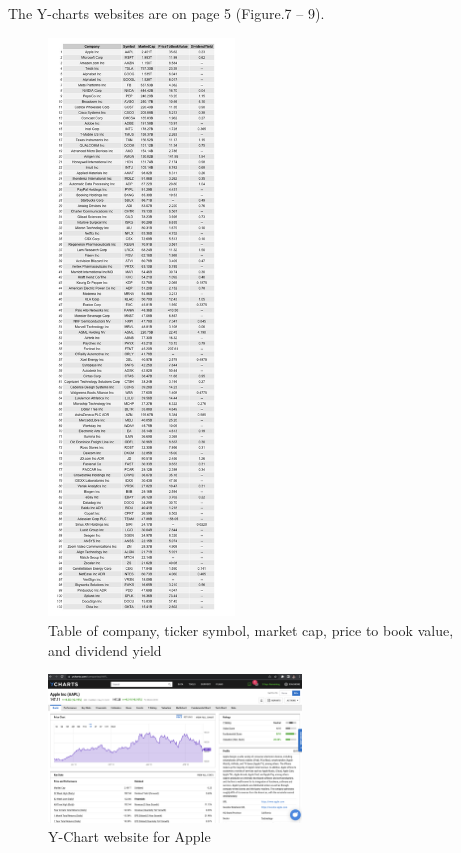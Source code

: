 \documentclass[11pt]{article}
\begin{document}
The Y-charts websites are on page 5 (Figure.7 -- 9).
\begin{figure}[H]
    \centering
    \includegraphics[width=0.44\textwidth]{figures/Q3b_data.jpg}
    \caption{Table of company, ticker symbol, market cap, price to book value, and dividend yield}
\end{figure}
\begin{figure}[H]
    \centering
    \includegraphics[width=0.6\textwidth]{figures/AAPL.png}
    \caption{Y-Chart website for Apple}
\end{figure}
\end{document}
